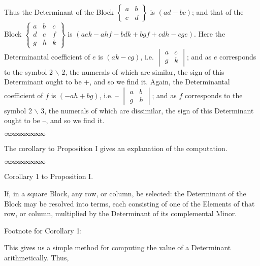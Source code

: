 \documentclass[11pt]{article}%
\theoremstyle{definition}
\newcommand{\sep}{\vspace{-3pt} \begin{center}
{\mathversion{normal}
$\infty \mspace{-5.5mu} \infty \mspace{-5.5mu}
\infty \mspace{-5.5mu} \infty \mspace{-5.5mu}
\infty \mspace{-5.5mu} \infty \mspace{-5.5mu}
\infty \mspace{-5.5mu} \infty$}
\end{center} \vspace{-3pt}}
\begin{document}
\textsf{Thus the Determinant of the Block }$%
\begin{Bmatrix}
a & b\\
c & d
\end{Bmatrix}
$\textsf{ is }$(ad-bc)$\textsf{; and that of the Block }$%
\begin{Bmatrix}
a & b & c\\
d & e & f\\
g & h & k
\end{Bmatrix}
$\textsf{ is }$(aek-ahf-bdk+bgf+cdh-cge)$\textsf{. Here the Determinantal
coefficient of }$e$\textsf{ is }$(ak-cg)$\textsf{, i.e. }$%
\begin{vmatrix}
a & c\\
g & k
\end{vmatrix}
$\textsf{; and as }$e$\textsf{ corresponds to the symbol 2%
$\backslash$%
2, the numerals of which are similar, the sign of this Determinant ought to be
+, and so we find it. Again, the Determinantal coefficient of }$f$\textsf{ is
}$(-ah+bg)$\textsf{, i.e. -- }$%
\begin{vmatrix}
a & b\\
g & h
\end{vmatrix}
$\textsf{; and as }$f$\textsf{ corresponds to the symbol 2%
$\backslash$%
3, the numerals of which are dissimilar, the sign of this Determinant ought to
be --, and so we find it.}%

\sep


The corollary to Proposition I gives an explanation of the computation.%

\sep


\begin{center}
\textsf{Corollary 1 to Proposition I.}
\end{center}

\textsf{If, in a square Block, any row, or column, be selected: the
Determinant of the Block may be resolved into terms, each consisting of one of
the Elements of that row, or column, multiplied by the Determinant of its
complemental Minor.}

\bigskip

\textsf{Footnote for Corollary 1:}

\textsf{This gives us a simple method for computing the value of a Determinant
arithmetically. Thus,}
\end{document}

